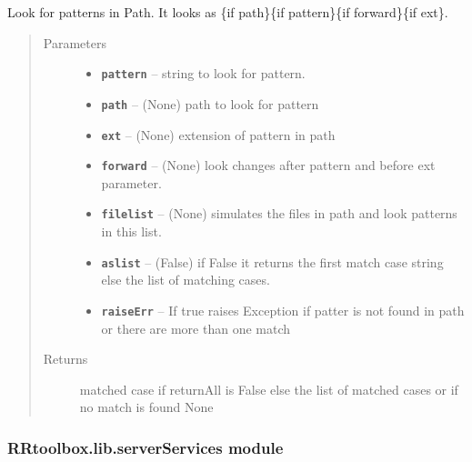 \documentclass[letterpaper,10pt,english]{sphinxmanual}
\begin{document}
\begin{fulllineitems}
\label{RRtoolbox.lib:RRtoolbox.lib.root.lookinglob}
Look for patterns in Path. It looks as \{if path\}\{if pattern\}\{if forward\}\{if ext\}.
\begin{quote}\begin{description}
\item[{Parameters}] \leavevmode\begin{itemize}
\item {} 
\textbf{\texttt{pattern}} -- string to look for pattern.

\item {} 
\textbf{\texttt{path}} -- (None) path to look for pattern

\item {} 
\textbf{\texttt{ext}} -- (None) extension of pattern in path

\item {} 
\textbf{\texttt{forward}} -- (None) look changes after pattern and before ext parameter.

\item {} 
\textbf{\texttt{filelist}} -- (None) simulates the files in path and look patterns in this list.

\item {} 
\textbf{\texttt{aslist}} -- (False) if False it returns the first match case string
else the list of matching cases.

\item {} 
\textbf{\texttt{raiseErr}} -- If true raises Exception if patter is not found in path or there
are more than one match

\end{itemize}

\item[{Returns}] \leavevmode
matched case if returnAll is False else the list of matched cases
or if no match is found None

\end{description}\end{quote}

\end{fulllineitems}



\subsubsection{RRtoolbox.lib.serverServices module}
\label{RRtoolbox.lib:rrtoolbox-lib-serverservices-module}\label{RRtoolbox.lib:module-RRtoolbox.lib.serverServices}
\end{document}
